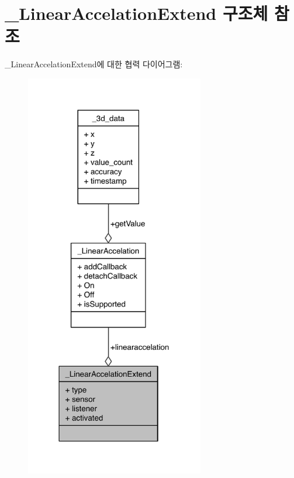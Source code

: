\hypertarget{struct__LinearAccelationExtend}{\section{\-\_\-\-Linear\-Accelation\-Extend 구조체 참조}
\label{struct__LinearAccelationExtend}
}


\-\_\-\-Linear\-Accelation\-Extend에 대한 협력 다이어그램\-:\nopagebreak
\begin{figure}[H]
\begin{center}
\leavevmode
\includegraphics[width=221pt]{d4/d94/struct__LinearAccelationExtend__coll__graph}
\end{center}
\end{figure}
